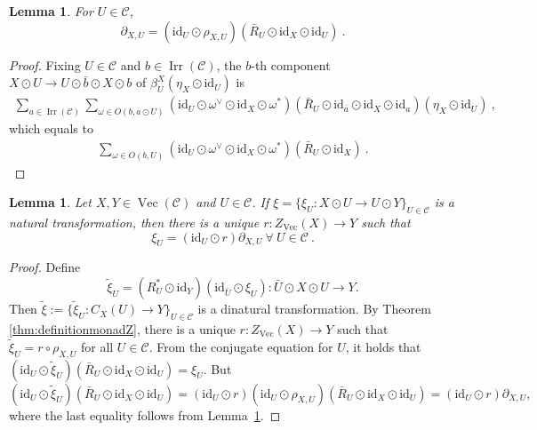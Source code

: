 \documentclass[a4paper,11pt,reqno]{amsart}
\numberwithin{equation}{section}
\newtheorem{lemma}[theorem]{Lemma}
\theoremstyle{remark}
\theoremstyle{definition}
\newcommand{\cC}{\mathcal C}
\DeclareMathOperator{\Irr}{Irr}
\DeclareMathOperator{\Vect}{Vec}
\newcommand{\id}{\mathrm{id}}
\begin{document}
\begin{lemma}
	For $U \in \cC$, 
	$$\partial_{X,U} = (\id_U \odot \rho_{X,U})(\bar{R}_U \odot \id_X \odot \id_U) \ . $$
	\label{lemma:recoveringVirelizierTuraevformula}
\end{lemma}
\begin{proof}
	Fixing $U \in \cC$ and $b \in \Irr(\cC)$, the $b$-th component $X \odot U \to U \odot \bar{b} \odot X \odot b$ of $\beta^X_U(\eta_X \odot \id_U)$ is
	\begin{align*}
		\sum_{a \in \Irr(\cC)} \sum_{ \omega \in O(b,a\odot U)}  (\id_U \odot \omega^\vee \odot \id_X \odot \omega^*)(\bar{R}_U \odot \id_{\bar{a}} \odot \id_X \odot \id_{a})(\eta_X \odot \id_U) \ ,
	\end{align*}
	which equals to 
	\begin{align*}
		\sum_{\omega \in O(b,U)}  (\id_U \odot \omega^\vee \odot \id_X \odot \omega^*)(\bar{R}_U \odot \id_X) \ . 
	\end{align*}
\end{proof}

\begin{lemma}
	Let $X,Y \in \Vect(\cC)$ and $U \in \cC$. If $\xi = \{\xi_U: X \odot U \to U \odot Y \}_{U \in \cC}$ is a natural transformation, then there is a unique $r: Z_{\Vect}(X) \to Y$ such that
	$$\xi_U = (\id_U \odot r) \partial_{X,U} \ \forall \ U \in \cC \ . $$
	\label{lemma:factorizationpropofZpart1}
\end{lemma}
\begin{proof}
	Define 
	\[
	\tilde{\xi}_U = (R_U^* \odot \id_Y)(\id_{\bar{U}} \odot \xi_U): \bar{U} \odot X \odot U \to Y.
	\]
	Then $\tilde{\xi} := \{ \tilde{\xi}_U: C_X(U) \to Y \}_{U \in \cC}$ is a dinatural transformation. By Theorem \ref{thm:definitionmonadZ}, there is a unique $r: Z_{\Vect}(X) \to Y$ such that $\tilde{\xi}_U = r \circ \rho_{X,U}$ for all $U \in \cC$. From the conjugate equation for $U$, it holds that $(\id_U \odot \tilde{\xi}_U)(\bar{R}_U \odot \id_X \odot \id_U) = \xi_U$. But
	\[
	(\id_U \odot \tilde{\xi}_U)(\bar{R}_U \odot \id_X \odot \id_U) = (\id_U \odot r)(\id_U \odot \rho_{X,U})(\bar{R}_U \odot \id_X \odot \id_U) = (\id_U \odot r) \partial_{X,U} ,
	\]
	where the last equality follows from Lemma~\ref{lemma:recoveringVirelizierTuraevformula}.
\end{proof}
\end{document}
